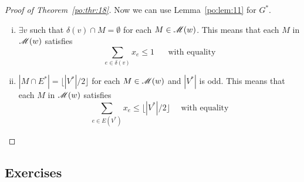 \begin{proof}[Proof of Theorem~\ref{po:thr:18}]
      Now we can use Lemma~\ref{po:lem:11} for $G^*$. 
      
      \begin{enumerate}[i)]
      \item $\exists v$ such that $\delta(v) \cap M = \emptyset$ for each $M \in
        \mathscr{M}(w)$. This means that each $M$ in $\mathscr{M}(w)$ satisfies
        \begin{displaymath}
          \sum_{e \in          \delta(v)} x_e\leq1 \quad \text{ {with equality}}
         \end{displaymath}
      \item $|M\cap E^*| =   \lfloor|V^*| /2\rfloor$ for each $M \in \mathscr{M}(w)$ and $|V^*|$
        is odd. This means that each $M$ in $\mathscr{M}(w)$ satisfies
        \begin{displaymath}
           \sum_{e \in E(V^*)          } x_e\leq \lfloor|V^*|/2\rfloor \quad \text{
             {with equality}} 
        \end{displaymath}
      \end{enumerate}

    \end{proof}


\subsection*{Exercises}

